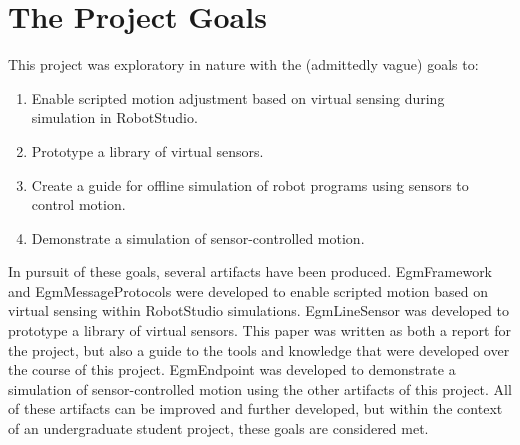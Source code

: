 \documentclass{cslthse-msc}
\begin{document}
\section{The Project Goals}
\label{sec:Anal_Con:Goals}
This project was exploratory in nature with the (admittedly vague) goals to:
\begin{enumerate}
    \item Enable scripted motion adjustment based on virtual sensing during simulation in RobotStudio.
    \item Prototype a library of virtual sensors.
    \item Create a guide for offline simulation of robot programs using sensors to control motion.
    \item Demonstrate a simulation of sensor-controlled motion. 
\end{enumerate}
In pursuit of these goals, several artifacts have been produced. EgmFramework and EgmMessageProtocols were developed to enable scripted motion based on virtual sensing within RobotStudio simulations. EgmLineSensor was developed to prototype a library of virtual sensors. This paper was written as both a report for the project, but also a guide to the tools and knowledge that were developed over the course of this project. EgmEndpoint was developed to demonstrate a simulation of sensor-controlled motion using the other artifacts of this project. All of these artifacts can be improved and further developed, but within the context of an undergraduate student project, these goals are considered met. 
\end{document}
